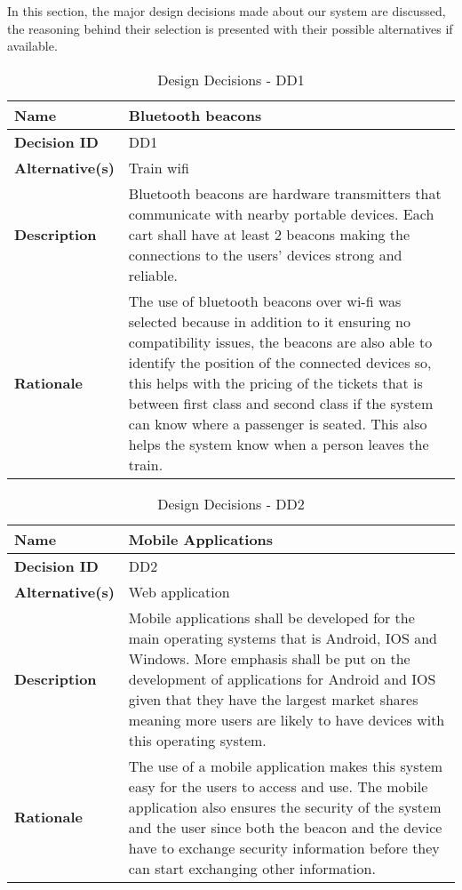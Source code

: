 
In this section, the major design decisions made about our system are discussed, the reasoning behind their selection is presented with their possible alternatives if available.
\begin{table}[H]
	\centering
	\begin{tabularx}{\linewidth}{l|X}
		\textbf{Name}      & Bluetooth beacons \\ \hline
		\textbf{Decision ID}  & DD1 \\ \hline
		\textbf{Alternative(s)}     & Train wifi  \\ \hline
		\textbf{Description}   & Bluetooth beacons are hardware transmitters that communicate with nearby portable devices. Each cart shall have at least 2 beacons making the connections to the users' devices strong and reliable. \\ \hline
		\textbf{Rationale}    & The use of bluetooth beacons over wi-fi was selected because in addition to it ensuring no compatibility issues, the beacons are also able to identify the position of the connected devices so, this helps with the pricing of the tickets that is between first class and second class if the system can know where a passenger is seated. This also helps the system know when a person leaves the train. \\ \hline
	\end{tabularx}
	\caption{Design Decisions - DD1}
	\label{tbl:DD1}
\end{table}

\begin{table}[H]
	\centering
	\begin{tabularx}{\linewidth}{l|X}
		\textbf{Name}      & Mobile Applications\\ \hline
		\textbf{Decision ID}  & DD2 \\ \hline
		\textbf{Alternative(s)}     & Web application \\ \hline
		\textbf{Description}   & Mobile applications shall be developed for the main operating systems that is Android, IOS and Windows. More emphasis shall be put on the development of applications for Android and IOS given that they have the largest market shares meaning more users are likely to have devices with this operating system.\\ \hline
		\textbf{Rationale}    & The use of a mobile application makes this system easy for the users to access and use. The mobile application also ensures the security of the system and the user since both the beacon and the device have to exchange security information before they can start exchanging other information. \\ \hline
	\end{tabularx}
	\caption{Design Decisions - DD2}
	\label{tbl:DD2}
\end{table}

